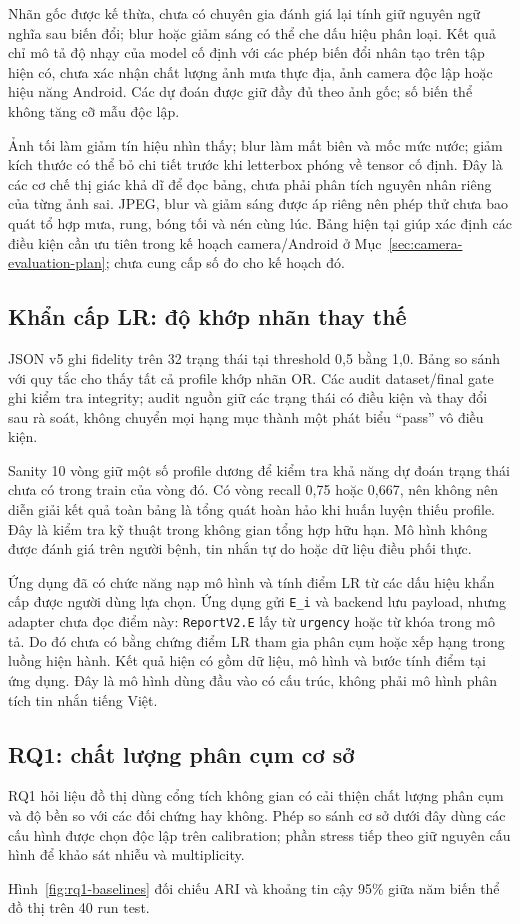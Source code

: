 Nhãn gốc được kế thừa, chưa có chuyên gia đánh giá lại tính giữ nguyên ngữ nghĩa sau biến đổi; blur hoặc giảm sáng có thể che dấu hiệu phân loại. Kết quả chỉ mô tả độ nhạy của model cố định với các phép biến đổi nhân tạo trên tập hiện có, chưa xác nhận chất lượng ảnh mưa thực địa, ảnh camera độc lập hoặc hiệu năng Android. Các dự đoán được giữ đầy đủ theo ảnh gốc; số biến thể không tăng cỡ mẫu độc lập.

Ảnh tối làm giảm tín hiệu nhìn thấy; blur làm mất biên và mốc mức nước; giảm kích thước có thể bỏ chi tiết trước khi letterbox phóng về tensor cố định. Đây là các cơ chế thị giác khả dĩ để đọc bảng, chưa phải phân tích nguyên nhân riêng của từng ảnh sai. JPEG, blur và giảm sáng được áp riêng nên phép thử chưa bao quát tổ hợp mưa, rung, bóng tối và nén cùng lúc. Bảng hiện tại giúp xác định các điều kiện cần ưu tiên trong kế hoạch camera/Android ở Mục~\ref{sec:camera-evaluation-plan}; chưa cung cấp số đo cho kế hoạch đó.

\subsection{Khẩn cấp LR: độ khớp nhãn thay thế}
JSON v5 ghi fidelity trên 32 trạng thái tại threshold 0,5 bằng 1,0. Bảng so sánh với quy tắc cho thấy tất cả profile khớp nhãn OR. Các audit dataset/final gate ghi kiểm tra integrity; audit nguồn giữ các trạng thái có điều kiện và thay đổi sau rà soát, không chuyển mọi hạng mục thành một phát biểu ``pass'' vô điều kiện.

Sanity 10 vòng giữ một số profile dương để kiểm tra khả năng dự đoán trạng thái chưa có trong train của vòng đó. Có vòng recall 0,75 hoặc 0,667, nên không nên diễn giải kết quả toàn bảng là tổng quát hoàn hảo khi huấn luyện thiếu profile. Đây là kiểm tra kỹ thuật trong không gian tổng hợp hữu hạn. Mô hình không được đánh giá trên người bệnh, tin nhắn tự do hoặc dữ liệu điều phối thực.

Ứng dụng đã có chức năng nạp mô hình và tính điểm LR từ các dấu hiệu khẩn cấp được người dùng lựa chọn. Ứng dụng gửi \texttt{E\_i} và backend lưu payload, nhưng adapter chưa đọc điểm này: \texttt{ReportV2.E} lấy từ \texttt{urgency} hoặc từ khóa trong mô tả. Do đó chưa có bằng chứng điểm LR tham gia phân cụm hoặc xếp hạng trong luồng hiện hành. Kết quả hiện có gồm dữ liệu, mô hình và bước tính điểm tại ứng dụng. Đây là mô hình dùng đầu vào có cấu trúc, không phải mô hình phân tích tin nhắn tiếng Việt.

\subsection{RQ1: chất lượng phân cụm cơ sở}\label{sec:rq1-discussion}
RQ1 hỏi liệu đồ thị dùng cổng tích không gian có cải thiện chất lượng phân cụm và độ bền so với các đối chứng hay không. Phép so sánh cơ sở dưới đây dùng các cấu hình được chọn độc lập trên calibration; phần stress tiếp theo giữ nguyên cấu hình để khảo sát nhiễu và multiplicity.

Hình~\ref{fig:rq1-baselines} đối chiếu ARI và khoảng tin cậy 95\% giữa năm biến thể đồ thị trên 40 run test.

